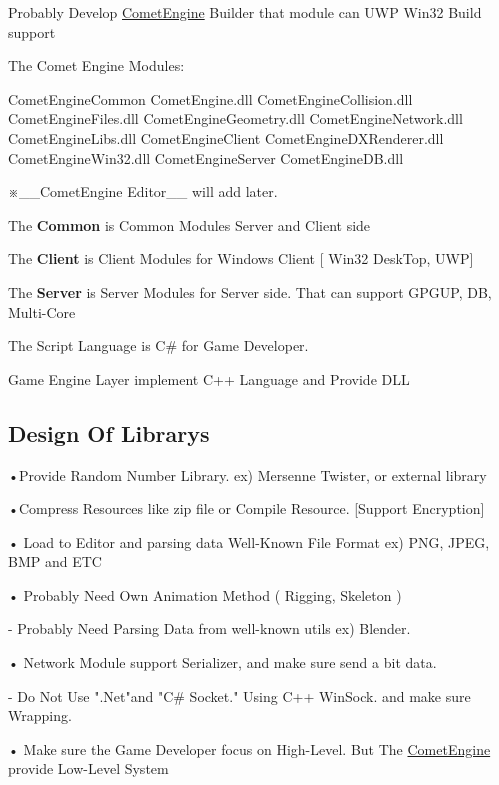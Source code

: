 Probably Develop \textquotesingle{}\hyperlink{namespace_comet_engine}{Comet\+Engine} Builder\textquotesingle{} that module can U\+WP Win32 Build support

The Comet Engine Modules\+: \begin{DoxyVerb}CometEngineCommon
  CometEngine.dll
  CometEngineCollision.dll
  CometEngineFiles.dll
  CometEngineGeometry.dll
  CometEngineNetwork.dll
  CometEngineLibs.dll
CometEngineClient
  CometEngineDXRenderer.dll
  CometEngineWin32.dll
CometEngineServer
  CometEngineDB.dll
\end{DoxyVerb}


※\+\_\+\+\_\+\+Comet\+Engine Editor\+\_\+\+\_\+ will add later.

The {\bfseries Common} is Common Modules Server and Client side

The {\bfseries Client} is Client Modules for Windows Client \mbox{[} Win32 Desk\+Top, U\+WP\mbox{]}

The {\bfseries Server} is Server Modules for Server side. That can support G\+P\+G\+UP, DB, Multi-\/\+Core

The Script Language is C\# for Game Developer.

Game Engine Layer implement C++ Language and Provide D\+LL

\subsection*{Design Of Librarys}

•\+Provide Random Number Library. ex) Mersenne Twister, or external library

•\+Compress Resources like zip file or Compile Resource. \mbox{[}Support Encryption\mbox{]}

• Load to Editor and parsing data Well-\/\+Known File Format ex) P\+NG, J\+P\+EG, B\+MP and E\+TC

• Probably Need Own Animation Method ( Rigging, Skeleton ) \begin{DoxyVerb}- Probably Need Parsing Data from well-known utils ex) Blender.
\end{DoxyVerb}


• Network Module support Serializer, and make sure send a bit data. \begin{DoxyVerb} - Do Not Use ".Net"and "C# Socket." Using C++ WinSock. and make sure Wrapping.
\end{DoxyVerb}
 • Make sure the Game Developer focus on High-\/\+Level. But The \hyperlink{namespace_comet_engine}{Comet\+Engine} provide Low-\/\+Level System

